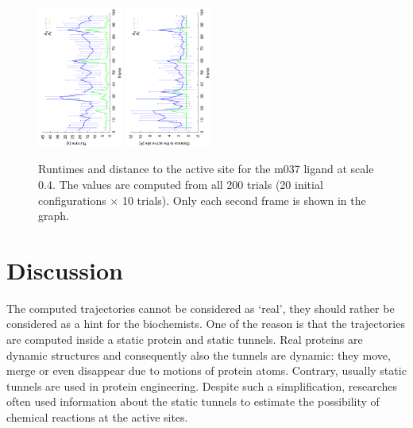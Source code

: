 \documentclass[usletter, 10pt, conference]{ieeeconf} %
\begin{document}
{\def\a{270}
\begin{figure}
\centering
\includegraphics[width=0.25\textwidth,angle=\a]{fig/m037tmins-03tunnel-1rrt_path_time-2}
\includegraphics[width=0.25\textwidth,angle=\a]{fig/m037tmins-03tunnel-1trajDistToGoal-2}
\caption{\label{fig::comparison}
    Runtimes and distance to the active site for the m037 ligand at scale 0.4.
    The values are computed from all 200 trials (20 initial configurations $\times$ 10 trials).
    Only each second frame is shown in the graph.
}
\end{figure}
}



\section{Discussion}

The computed trajectories cannot be considered as `real', they should rather be considered as a hint for the biochemists.
One of the reason is that the trajectories are computed inside a static protein and static tunnels.
Real proteins are dynamic structures and consequently also the tunnels are dynamic: they move, merge or even disappear due to motions of protein atoms.
Contrary, usually static tunnels are used in protein engineering.
Despite such a simplification, researches often used information about the static tunnels  to estimate the possibility of chemical reactions
at the active sites.
\end{document}
